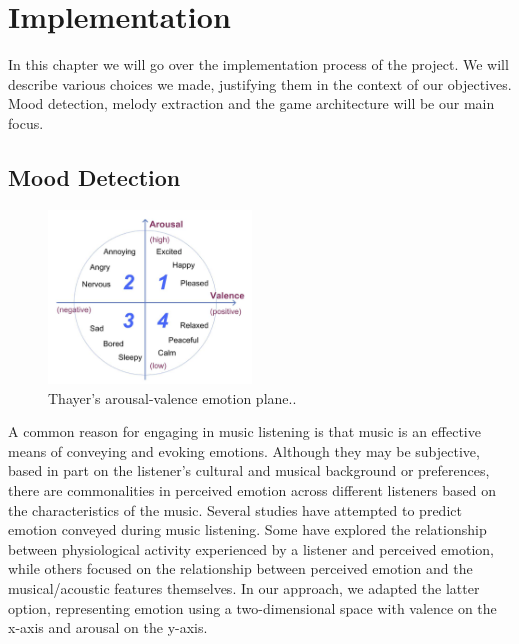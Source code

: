 
\chapter{Implementation} %

\label{Chapter3} %



In this chapter we will go over the implementation process of the project. We will describe various choices we made, justifying them in the context of our objectives. Mood detection, melody extraction and the game architecture will be our main focus.

\vspace{20pt}

\section{Mood Detection}

\begin{figure}
  \vspace{-40pt}

  \begin{center}
    \includegraphics[width=0.48\textwidth]{Figures/ThayersAV}
  \end{center}
  \caption{Thayer’s arousal-valence emotion plane.\cite{mood}.}
  \label{fig:Thayer}
\end{figure}

A common reason for engaging in music listening is that music is an effective means of conveying and evoking emotions. Although they may be subjective, based in part on the listener’s cultural and musical background or preferences, there are commonalities in perceived emotion across different listeners based on the characteristics of the music. Several studies have attempted to predict emotion conveyed during music listening. Some have explored the relationship between physiological activity experienced by a listener and perceived emotion, while others focused on the relationship between perceived emotion and the musical/acoustic features themselves. In our approach, we adapted the latter option, representing emotion using a two-dimensional space with valence on the x-axis and arousal on the y-axis.


